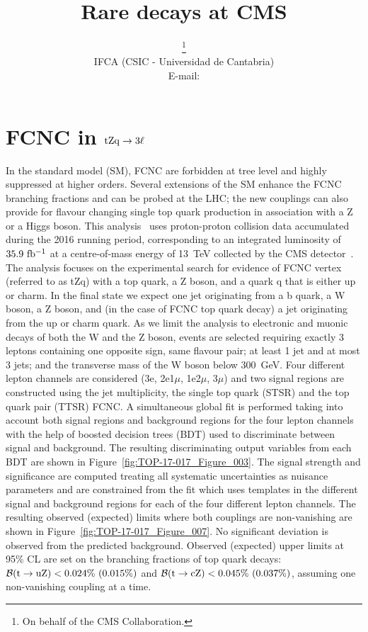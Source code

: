 \documentclass{PoS}
\title{Rare decays at CMS}
\author{\speaker{J\'onatan Piedra}\thanks{On behalf of the CMS Collaboration.}\\
        IFCA (CSIC - Universidad de Cantabria)\\
        E-mail: \email{piedra@cern.ch}}
\begin{document}
\section{FCNC in ${\rm tZq \to 3\ell}$}

In the standard model (SM), FCNC are
forbidden at tree level and highly suppressed at higher orders. Several
extensions of the SM enhance the FCNC branching fractions and can be probed at
the LHC; the new couplings can also provide for flavour changing single top
quark production in association with a Z or a Higgs boson.
This analysis~\cite{top-17-017} uses proton-proton collision data accumulated
during the 2016 running period, corresponding to an integrated luminosity of
${\rm 35.9~fb^{-1}}$ at a centre-of-mass energy of 13~TeV collected by the CMS
detector~\cite{cms-detector}. The analysis focuses on the experimental search
for evidence of FCNC
vertex (referred to as tZq) with a top quark, a Z boson, and a quark q that is
either up or charm. In the final state we expect one jet originating from a b quark,
a W boson, a Z boson, and (in the case of FCNC top quark decay) a jet originating
from the up or charm quark. As we limit the analysis to electronic and muonic
decays of both the
W and the Z boson, events are selected requiring exactly 3 leptons containing one
opposite sign, same flavour pair; at least 1 jet and at most 3 jets; and the
transverse mass of the W boson below 300~GeV. Four different lepton channels are
considered (3e, 2e1$\mu$, 1e2$\mu$, 3$\mu$) and two signal regions are constructed
using the jet multiplicity, the single top quark (STSR) and the top quark pair
(TTSR) FCNC. A simultaneous global fit is performed taking into account
both signal regions and background regions for the four lepton channels with the
help of boosted decision trees (BDT) used to discriminate between signal and
background. The resulting discriminating output variables from each BDT are
shown in Figure~\ref{fig:TOP-17-017_Figure_003}. The signal strength and significance
are computed treating all systematic uncertainties as nuisance parameters and are
constrained from the fit which uses templates in the different signal and
background regions for each of the four different lepton channels. The resulting
observed (expected) limits where both couplings are non-vanishing are shown in
Figure~\ref{fig:TOP-17-017_Figure_007}. No significant deviation is observed from
the predicted background. Observed (expected) upper limits at 95\% CL are set on
the branching fractions of top quark decays:
${\cal B}({\rm t \to uZ}) < 0.024\%~(0.015\%)$ and
${\cal B}({\rm t \to cZ}) < 0.045\%~(0.037\%)$, assuming one non-vanishing
coupling at a time.
\end{document}
